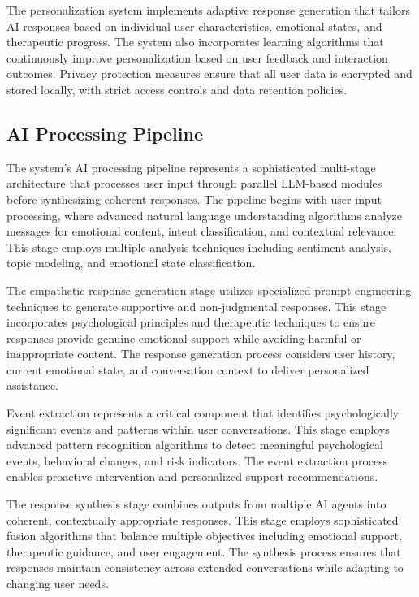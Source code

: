 The personalization system implements adaptive response generation that tailors AI responses based on individual user characteristics, emotional states, and therapeutic progress. The system also incorporates learning algorithms that continuously improve personalization based on user feedback and interaction outcomes. Privacy protection measures ensure that all user data is encrypted and stored locally, with strict access controls and data retention policies.

\subsection{AI Processing Pipeline}

The system's AI processing pipeline represents a sophisticated multi-stage architecture that processes user input through parallel LLM-based modules before synthesizing coherent responses. The pipeline begins with user input processing, where advanced natural language understanding algorithms analyze messages for emotional content, intent classification, and contextual relevance. This stage employs multiple analysis techniques including sentiment analysis, topic modeling, and emotional state classification.

The empathetic response generation stage utilizes specialized prompt engineering techniques to generate supportive and non-judgmental responses. This stage incorporates psychological principles and therapeutic techniques to ensure responses provide genuine emotional support while avoiding harmful or inappropriate content. The response generation process considers user history, current emotional state, and conversation context to deliver personalized assistance.

Event extraction represents a critical component that identifies psychologically significant events and patterns within user conversations. This stage employs advanced pattern recognition algorithms to detect meaningful psychological events, behavioral changes, and risk indicators. The event extraction process enables proactive intervention and personalized support recommendations.

The response synthesis stage combines outputs from multiple AI agents into coherent, contextually appropriate responses. This stage employs sophisticated fusion algorithms that balance multiple objectives including emotional support, therapeutic guidance, and user engagement. The synthesis process ensures that responses maintain consistency across extended conversations while adapting to changing user needs.


